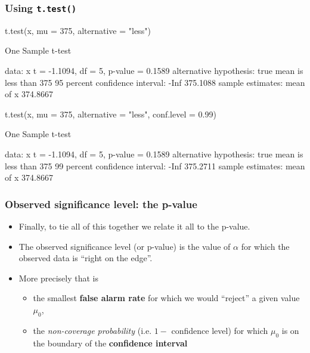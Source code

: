 \documentclass[a4paper]{article}
\begin{document}
\subsubsection{Using \lstinline|t.test()|}
\begin{Schunk}
\begin{Sinput}
t.test(x, mu = 375, alternative = "less")
\end{Sinput}
\begin{Soutput}

	One Sample t-test

data:  x
t = -1.1094, df = 5, p-value = 0.1589
alternative hypothesis: true mean is less than 375
95 percent confidence interval:
     -Inf 375.1088
sample estimates:
mean of x 
 374.8667 
\end{Soutput}
\begin{Sinput}
t.test(x, mu = 375, alternative = "less", conf.level = 0.99)
\end{Sinput}
\begin{Soutput}

	One Sample t-test

data:  x
t = -1.1094, df = 5, p-value = 0.1589
alternative hypothesis: true mean is less than 375
99 percent confidence interval:
     -Inf 375.2711
sample estimates:
mean of x 
 374.8667 
\end{Soutput}
\end{Schunk}
\subsubsection{Observed significance level: the p-value}
\begin{itemize}
	\item Finally, to tie all of this together we relate it all to the p-value.
	\item The observed significance level (or p-value) is the value of \( \alpha \) for which the observed data is ``right on the edge''.
	\item More precisely that is
	\begin{itemize}
		\item the smallest \textcolor{mygreen}{\textbf{false alarm rate}} for which we would ``reject'' a given value \( \mu_0 \),
		\item the \textit{non-coverage probability} (i.e. \( 1 - \) confidence level) for which \( \mu_0 \) is on the boundary of the \textcolor{myred}{\textbf{confidence interval}}
	\end{itemize}
\end{itemize}
\end{document}
